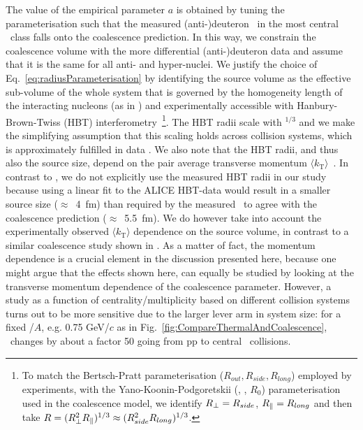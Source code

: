 \documentclass[%
 reprint,
 amsmath,amssymb,
 aps,
]{revtex4-1}
\begin{document}
The value of the empirical parameter $a$ is obtained by tuning the parameterisation such that the measured (anti-)deuteron \btwo~in the most central \PbPb~class falls onto the coalescence prediction. 
In this way, we constrain the coalescence volume with the more differential (anti-)deuteron data and assume that it is the same for all anti- and hyper-nuclei. 
We justify the choice of Eq.~\ref{eq:radiusParameterisation} by identifying the source volume as the effective sub-volume of the whole system that is governed by the homogeneity length of the interacting nucleons (as in \cite{Scheibl:1998tk}) and experimentally accessible with Hanbury-Brown-Twiss (HBT) interferometry~\footnote{To match the Bertsch-Pratt parameterisation ($R_{out}, R_{side}, R_{long}$) employed by experiments, with the Yano-Koonin-Podgoretskii (\rperp, \rpar, $R_{0}$) parameterisation used in the coalescence model,  we identify $R_{\perp} = R_{side}$, $R_{\|} = R_{long}$ and then take $R = (R_{\perp}^{2}R_{\|})^{1/3} \approx (R_{side}^{2}R_{long})^{1/3}$.}.
The HBT radii scale with \avdNdeta$^{1/3}$ and we make the simplifying assumption that this scaling holds across collision systems, which is approximately fulfilled in data \cite{Adam:2015vna,Adam:2015pya}. 
We also note that the HBT radii, and thus also the source size, depend on the pair average transverse momentum $\langle k_{\mathrm{T}}\rangle$~\cite{Aamodt:2011mr}. 
In contrast to \cite{Blum:2017qnn}, we do not explicitly use the measured HBT radii in our study because using a linear fit to the ALICE HBT-data \cite{Abelev:2012sq,Adam:2015vna} would result in a smaller source size ($\approx$~4~fm) than required by the measured \btwo~to agree with the coalescence prediction ($\approx$~5.5~fm).
We do however take into account the experimentally observed $\langle k_{\mathrm{T}}\rangle$ dependence on the source volume, in contrast to a similar coalescence study shown in \cite{Sun:2018mqq}. 
As a matter of fact, the momentum dependence is a crucial element in the discussion presented here, because one might argue that the effects shown here, can equally be studied by looking at the transverse momentum dependence of the coalescence parameter. However, a study as a function of centrality/multiplicity based on different collision systems turns out to be more sensitive due to the larger lever arm in system size: for a fixed \pt/$A$, e.g. 0.75 GeV/$c$ as in Fig.~\ref{fig:CompareThermalAndCoalescence}, \btwo~changes by about a factor 50 going from pp to central \PbPb~collisions. 
\end{document}
